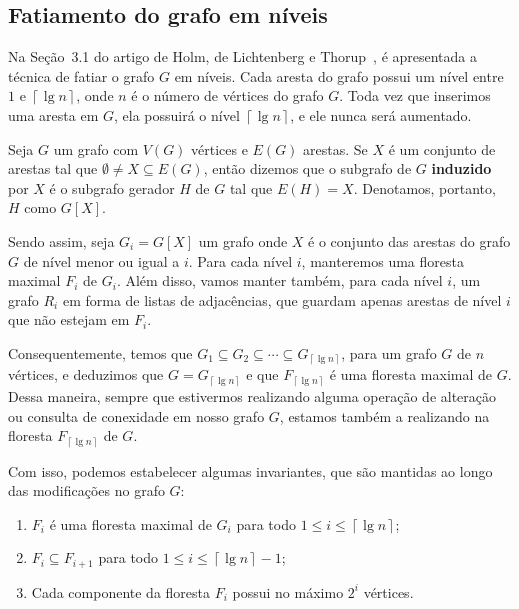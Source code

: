 \subsection{Fatiamento do grafo em níveis}
\label{sec:level-slicing}

Na Seção~3.1 do artigo de Holm, de Lichtenberg e Thorup~\cite{jacob_holm}, é apresentada a técnica de fatiar o grafo $G$ em níveis. Cada aresta do grafo possui um nível entre $1$ e $\left\lceil \lg n \right\rceil$, onde $n$ é o número de vértices do grafo $G$. Toda vez que inserimos uma aresta em $G$, ela possuirá o nível $\left\lceil \lg n \right\rceil$, e ele nunca será aumentado. 

Seja $G$ um grafo com $V(G)$ vértices e $E(G)$ arestas. Se $X$ é um conjunto de arestas tal que $\emptyset \neq X \subseteq E(G)$, então dizemos que o subgrafo de $G$ \textbf{induzido} por $X$ é o subgrafo gerador $H$ de $G$ tal que $E(H) = X$. Denotamos, portanto, $H$ como $G[X]$.

Sendo assim, seja $G_i = G[X]$ um grafo onde $X$ é o conjunto das arestas do grafo $G$ de nível menor ou igual a $i$. Para cada nível $i$, manteremos uma floresta maximal $F_i$ de $G_i$. Além disso, vamos manter também, para cada nível $i$, um grafo $R_i$ em forma de listas de adjacências, que guardam apenas arestas de nível $i$ que não estejam em $F_i$. 

Consequentemente, temos que $G_1 \subseteq G_2 \subseteq \cdots \subseteq G_{\left\lceil \lg n \right\rceil}$, para um grafo $G$ de $n$ vértices, e deduzimos que $G = G_{\left\lceil \lg n \right\rceil}$ e que $F_{\left\lceil \lg n \right\rceil}$ é uma floresta maximal de $G$. Dessa maneira, sempre que estivermos realizando alguma operação de alteração ou consulta de conexidade em nosso grafo $G$, estamos também a realizando na floresta $F_{\left\lceil \lg n \right\rceil}$ de $G$.

Com isso, podemos estabelecer algumas invariantes, que são mantidas ao longo das modificações no grafo $G$:

\begin{enumerate}[label=(\Roman*)]
    \item \label{invariant1} $F_i$ é uma floresta maximal de $G_i$ para todo $1 \leq i \leq  \left\lceil \lg n \right\rceil$;
    
    \item \label{invariant2} $F_i \subseteq F_{i+1}$ para todo $1 \leq i \leq \left\lceil \lg n \right\rceil - 1$;
    
    \item \label{invariant3} Cada componente da floresta $F_i$ possui no máximo $2^i$ vértices.
\end{enumerate}

